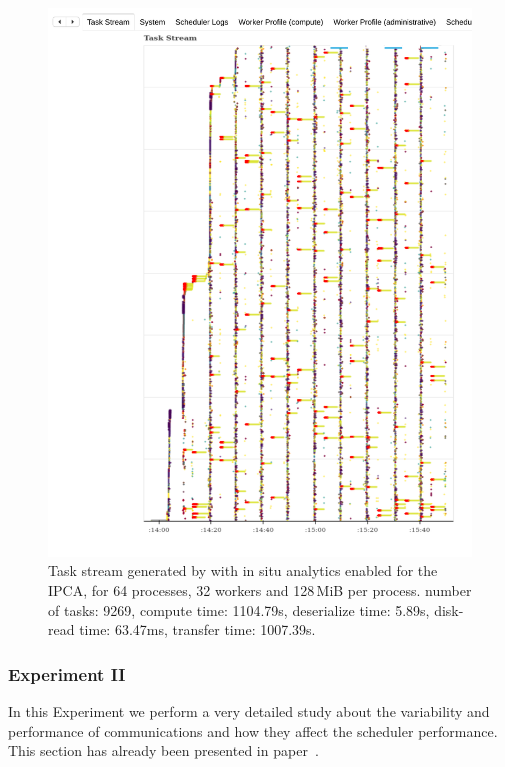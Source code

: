 \begin{figure}[ht]\centering
\includegraphics[width=\columnwidth]{figures/P64_W32_D128_DEISA.pdf}
\caption{Task stream generated by \dask with in situ analytics enabled for the IPCA, for 64 processes, 32 workers and 128\,MiB per process.
    number of tasks: 9269,
    compute time: 1104.79s,
    deserialize time: 5.89s,
    disk-read time: 63.47ms,
    transfer time: 1007.39s.}
\label{fig:taskstreamdeisa}
\end{figure}


\subsubsection{Experiment II}\label{XP2}

In this Experiment we perform a very detailed study about the variability and performance of \deisa communications and how they affect the scheduler performance. This section has already been presented in paper~\cite{deisa}.


